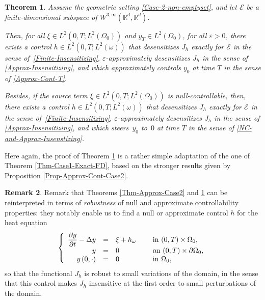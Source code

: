 \documentclass[11pt]{article}
\makeatletter
\numberwithin{equation}{section}
\DeclareRobustCommand{\mathbbm}[1]{\csname jepbb@#1\endcsname}
\newcommand\R{{\mathbb R}}
\newtheorem{theorem}{Theorem}[section]
\theoremstyle{definition}
\newtheorem{remark}[theorem]{Remark}
\makeatother
\begin{document}
\begin{theorem}
\label{Thm-Case2-Exact-FD}
Assume the geometric setting \eqref{Case-2-non-emptyset}, and let $\mathcal{E}$ be a finite-dimensional subspace of $W^{3, \infty}(\R^d, \R^d)$.

Then, for all $ \xi \in L^2(0,T; L^2(\Omega_0))$ and $y_T \in L^2(\Omega_0)$, for all $\varepsilon>0$, there exists a control $h\in L^2(0,T; L^2(\omega))$ that desensitizes $J_h$ exactly for $\mathcal{E}$ in the sense of~\eqref{Finite-Insensitizing}, $\varepsilon$\nobreakdash-approximately desensitizes $J_h$ in the sense of \eqref{Approx-Insensitizing}, and which approximately controls $y_0$ at time $T$ in the sense of \eqref{Approx-Cont-T}.

Besides, if {the source term} $ \xi\!\in\!L^2(0,T; L^2(\Omega_0))$ is null-controllable, then, there exists a control $h\!\in\!L^2(0,T; L^2(\omega))$ that desensitizes $J_h$ exactly for $\mathcal{E}$ in the sense of~\eqref{Finite-Insensitizing}, $\varepsilon$-approximately desensitizes $J_h$ in the sense of \eqref{Approx-Insensitizing}, and which steers~$y_0$ to~$0$ at time $T$ in the sense of \eqref{NC-and-Approx-Insenstizing}.
\end{theorem}

Here again, the proof of Theorem \ref{Thm-Case2-Exact-FD} is a rather simple adaptation of the one of Theorem \ref{Thm-Case1-Exact-FD}, based on the stronger results given by Proposition \ref{Prop-Approx-Cont-Case2}.
\begin{remark}
Remark that Theorems \ref{Thm-Approx-Case2} and \ref{Thm-Case2-Exact-FD} can be reinterpreted in terms of \textit{robustness} of null and approximate controllability properties: they notably enable us to find a null or approximate control $h$ for the heat equation
\begin{equation*}
\left\{
\begin{array}{rcll}
\dfrac{\partial y}{\partial t}-\Delta y &=&\xi +h\mathbbm{1}_{\omega}\quad&\text{ in }(0,T) \times \Omega_0,
\\
y &=& 0 &\text{ on }(0,T) \times \partial \Omega_0,
\\
y\left(0,\cdot\right) &=& 0 &\text{ in }\Omega_0,
\end{array}
\right.
\end{equation*}
so that the functional $J_h$ is robust to small variations of the domain, in the sense that this control makes $J_h$ insensitive at the first order to small perturbations of the domain.
\end{remark}
\end{document}
